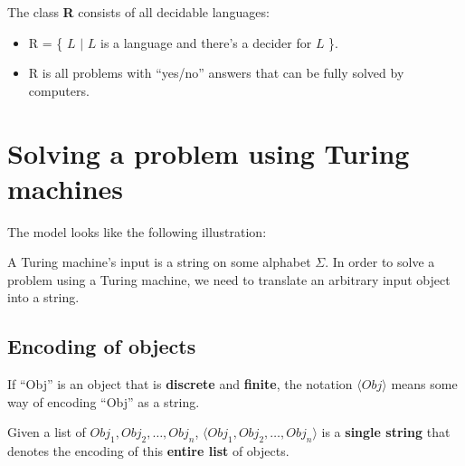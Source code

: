 \documentclass[12pt, letterpaper, oneside]{book}
\begin{document}
The class \textbf{R} consists of all decidable languages:
\begin{itemize}
  \item R = \{ $L$ $|$ $L$ is a language and there's a decider for $L$ \}.
  \item R is all problems with ``yes/no'' answers that can be fully solved by computers.
\end{itemize}

\section{Solving a problem using Turing machines}

The model looks like the following illustration:


A Turing machine's input is a string on some alphabet $\Sigma$. In order to solve a problem using a Turing machine, we
need to translate an arbitrary input object into a string.

\subsection{Encoding of objects}

If ``Obj'' is an object that is \textbf{discrete} and \textbf{finite}, the notation $\langle Obj \rangle$ means some
way of encoding ``Obj'' as a string.

Given a list of $Obj_1, Obj_2, \ldots, Obj_n$, $\langle Obj_1, Obj_2, \ldots, Obj_n \rangle$ is a \textbf{single string}
that denotes the encoding of this \textbf{entire list} of objects.
\end{document}
